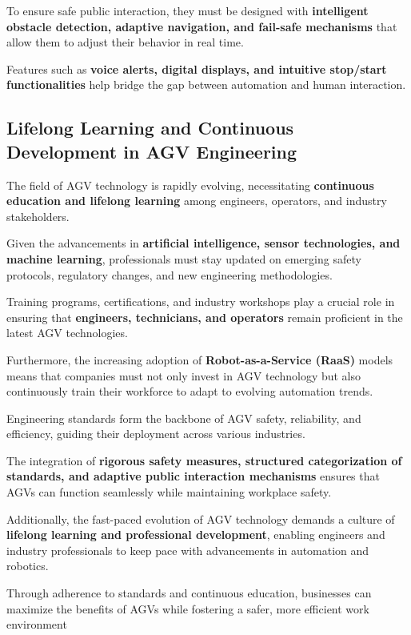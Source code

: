 \documentclass[../../main]{subfiles}
\begin{document}
To ensure safe public interaction, they must be designed with 
\textbf{intelligent obstacle detection, adaptive navigation, and fail-safe 
mechanisms} that allow them to adjust their behavior in real time. 

Features such as \textbf{voice alerts, digital displays, and intuitive 
stop/start functionalities} help bridge the gap between automation 
and human interaction.

\subsection{Lifelong Learning and Continuous Development in AGV Engineering}

The field of AGV technology is rapidly evolving, necessitating 
\textbf{continuous education and lifelong learning} among engineers, 
operators, and industry stakeholders. 

Given the advancements in \textbf{artificial intelligence, sensor technologies, 
and machine learning}, professionals must stay updated on emerging safety 
protocols, regulatory changes, and new engineering methodologies.

Training programs, certifications, and industry workshops play a crucial 
role in ensuring that \textbf{engineers, technicians, and operators} remain 
proficient in the latest AGV technologies. 

Furthermore, the increasing adoption of \textbf{Robot-as-a-Service (RaaS)} 
models means that companies must not only invest in AGV technology but 
also continuously train their workforce to adapt to evolving automation trends.



Engineering standards form the backbone of AGV safety, reliability, 
and efficiency, guiding their deployment across various industries. 

The integration of \textbf{rigorous safety measures, structured categorization 
of standards, and adaptive public interaction mechanisms} ensures that 
AGVs can function seamlessly while maintaining workplace safety. 

Additionally, the fast-paced evolution of AGV technology demands a culture 
of \textbf{lifelong learning and professional development}, enabling engineers 
and industry professionals to keep pace with advancements in automation 
and robotics. 

Through adherence to standards and continuous education, businesses 
can maximize the benefits of AGVs while fostering a safer, more efficient 
work environment
\end{document}
